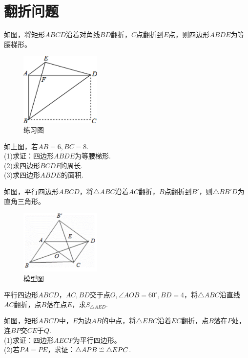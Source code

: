 \documentclass{ecnuthesis}
\newcommand\backcong{\mathrel{\reflectbox{$\cong$}}}
\begin{document}
\section{翻折问题}
\begin{model}
    如图，将矩形$ABCD$沿着对角线$BD$翻折，$C$点翻折到$E$点，则四边形$ABDE$为等腰梯形。
\end{model}
\begin{figure}[H]
\centering
\includegraphics[width=4cm]{picture/672.png}
\caption{练习图}
\end{figure}
\begin{problem}
    如上图，若$AB=6,BC=8$. \\
    (1)求证：四边形$ABDE$为等腰梯形. \\
    (2)求四边形$BCDF$的周长. \\
    (3)求四边形$ABDE$的面积.
\end{problem}
\begin{model}
    如图，平行四边形$ABCD$，将$\triangle ABC$沿着$AC$翻折，$B$点翻折到$B'$，则$\triangle BB'D$为直角三角形。\\
\end{model}
\begin{figure}[H]
\centering
\includegraphics[width=4cm]{picture/6131.png}
\caption{模型图}
\end{figure}
\begin{problem}
    平行四边形$ABCD$，$AC,BD$交于点$O,\angle AOB=60^\circ,BD=4$，将$\triangle ABC$沿直线$AC$翻折，点$B$落在点$E$，求$S_{\triangle AED}$.
\end{problem}
\begin{problem}
    如图，矩形$ABCD$中，$E$为边$AB$的中点，将$\triangle EBC$沿着$EC$翻折，点$B$落在$P$处，连$BP$交$CE$于$Q$. \\
    (1)求证：四边形$AECF$为平行四边形。\\
    (2)若$PA=PE$，求证：$\triangle APB \backcong \triangle EPC$.
\end{problem}
\end{document}
